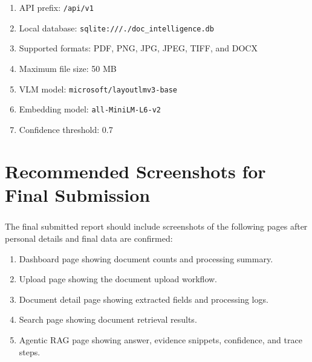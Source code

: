 \begin{enumerate}
    \item API prefix: \texttt{/api/v1}
    \item Local database: \texttt{sqlite:///./doc\_intelligence.db}
    \item Supported formats: PDF, PNG, JPG, JPEG, TIFF, and DOCX
    \item Maximum file size: 50 MB
    \item VLM model: \texttt{microsoft/layoutlmv3-base}
    \item Embedding model: \texttt{all-MiniLM-L6-v2}
    \item Confidence threshold: 0.7
\end{enumerate}

\chapter{Recommended Screenshots for Final Submission}
\label{appendix:screenshots}

\paragraph{} The final submitted report should include screenshots of the following pages after personal details and final data are confirmed:

\begin{enumerate}
    \item Dashboard page showing document counts and processing summary.
    \item Upload page showing the document upload workflow.
    \item Document detail page showing extracted fields and processing logs.
    \item Search page showing document retrieval results.
    \item Agentic RAG page showing answer, evidence snippets, confidence, and trace steps.
\end{enumerate}
